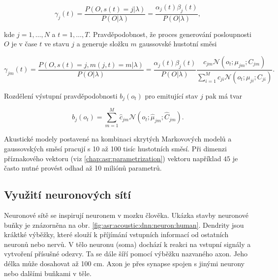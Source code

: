 \begin{equation}
 \gamma_{j}\left(t\right) = \frac{P\left(O, s\left(t\right)=j|\lambda\right)}{P\left(O|\lambda\right)} = \frac{\alpha_{j}\left(t\right)\beta_{j}\left(t\right)}{P\left(O|\lambda\right)} ,
  \label{eq:asr:acoustic:structure:gamma}
\end{equation}

\noindent kde $j = 1,\dots,N$ a $t = 1, \dots, T$. Pravděpodobnost, že proces generování posloupnosti $O$ je v čase $t$ ve stavu $j$ a generuje složku $m$ gaussovské hustotní směsi

\begin{equation}
  \gamma_{jm}\left(t\right) = \frac{P\left(O, s\left(t\right)=j, m\left(j,t\right)=m|\lambda\right)}{P\left(O|\lambda\right)} = \frac{\alpha_{j}\left(t\right)\beta_{j}\left(t\right)}{P\left(O|\lambda\right)} \frac{c_{jm}\mathcal{N}\left(o_t;\mu_{jm}; C_{jm}\right)}{\sum_{i=1}^{M} c_{ji} \mathcal{N}\left(o_t;\mu_{ji};C_{ji}\right) }.
   \label{eq:asr:acoustic:structure:gamma:one}
 \end{equation}

\noindent Rozdělení výstupní pravděpodobnosti $b_j\left(o_t\right)$ pro emitující stav $j$ pak má tvar

\begin{equation}
   b_{j}\left(o_t\right) = \sum_{m=1}^{M} \hat{c}_{jm} \mathcal{N}\left(o_t; \hat{\mu}_{jm}; \hat{C}_{jm}\right).
   \label{eq:asr:acoustic:gmm:output}
 \end{equation}

\noindent Akustické modely postavené na kombinaci skrytých Markovových modelů a gaussovských směsí pracují s 10 až 100 tisíc hustotních směsí. Při dimenzi příznakového vektoru (viz \ref{chap:asr:parametrization}) vektoru například $45$ je často nutné provést odhad až 10 miliónů parametrů.

\subsection{Využití neuronových sítí}
\label{chap:asr:acoustic:DNN}

Neuronové sítě se inspirují neuronem v mozku člověka. Ukázka stavby neuronové buňky je znázorněna na obr. \ref{fig:asr:acoustic:dnn:neuron:human}. Dendrity jsou kráktké výběžky, které slouží k příjímání vstupních informací od ostatních neuronů nebo nervů. V tělo neuronu (soma) dochází k reakci na vstupní signály a vytvoření přísušné odezvy. Ta se dále šíří pomocí výběžku nazvaného axon. Jeho délka může dosahovat až 100 cm. Axon je přes synapse spojen s jinými neurony nebo dalšími buňkami v těle.

